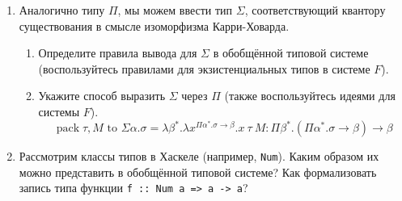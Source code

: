 \begin{enumerate}
    \item Аналогично типу $\Pi$, мы можем ввести тип $\Sigma$, соответствующий квантору существования
          в смысле изоморфизма Карри-Ховарда.
          \begin{enumerate}
              \item Определите правила вывода для $\Sigma$ в обобщённой типовой системе (воспользуйтесь правилами
                    для экзистенциальных типов в системе $F$).
              \item Укажите способ выразить $\Sigma$ через $\Pi$ (также воспользуйтесь идеями для системы $F$).
                    \[\operatorname{pack} \tau, M \text { to } \Sigma \alpha . \sigma=\lambda \beta^{*} . \lambda x^{\Pi \alpha^{*} . \sigma \rightarrow \beta} . x\ \tau\ M: \Pi \beta^{*} .\left(\Pi \alpha^{*} . \sigma \rightarrow \beta\right) \rightarrow \beta\]
          \end{enumerate}

    \item Рассмотрим классы типов в Хаскеле (например, \verb!Num!). Каким образом их можно представить в обобщённой
          типовой системе? Как формализовать запись типа функции \verb!f :: Num a => a -> a!?
\end{enumerate}



